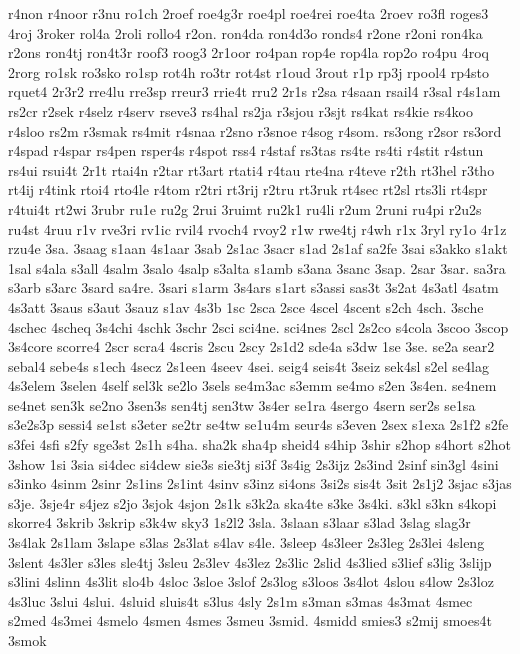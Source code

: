 {r4non
r4noor
r3nu
ro1ch
2roef
roe4g3r
roe4pl
roe4rei
roe4ta
2roev
ro3fl
roges3
4roj
3roker
rol4a
2roli
rollo4
r2on.
ron4da
ron4d3o
ronds4
r2one
r2oni
ron4ka
r2ons
ron4tj
ron4t3r
roof3
roog3
2r1oor
ro4pan
rop4e
rop4la
rop2o
ro4pu
4roq
2rorg
ro1sk
ro3sko
ro1sp
rot4h
ro3tr
rot4st
r1oud
3rout
r1p
rp3j
rpool4
rp4sto
rquet4
2r3r2
rre4lu
rre3sp
rreur3
rrie4t
rru2
2r1s
r2sa
r4saan
rsail4
r3sal
r4s1am
rs2cr
r2sek
r4selz
r4serv
rseve3
rs4hal
rs2ja
r3sjou
r3sjt
rs4kat
rs4kie
rs4koo
r4sloo
rs2m
r3smak
rs4mit
r4snaa
r2sno
r3snoe
r4sog
r4som.
rs3ong
r2sor
rs3ord
r4spad
r4spar
rs4pen
rsper4s
r4spot
rss4
r4staf
rs3tas
rs4te
rs4ti
r4stit
r4stun
rs4ui
rsui4t
2r1t
rtai4n
r2tar
rt3art
rtati4
r4tau
rte4na
r4teve
r2th
rt3hel
r3tho
rt4ij
r4tink
rtoi4
rto4le
r4tom
r2tri
rt3rij
r2tru
rt3ruk
rt4sec
rt2sl
rts3li
rt4spr
r4tui4t
rt2wi
3rubr
ru1e
ru2g
2rui
3ruimt
ru2k1
ru4li
r2um
2runi
ru4pi
r2u2s
ru4st
4ruu
r1v
rve3ri
rv1ic
rvil4
rvoch4
rvoy2
r1w
rwe4tj
r4wh
r1x
3ryl
ry1o
4r1z
rzu4e
3sa.
3saag
s1aan
4s1aar
3sab
2s1ac
3sacr
s1ad
2s1af
sa2fe
3sai
s3akko
s1akt
1sal
s4ala
s3all
4salm
3salo
4salp
s3alta
s1amb
s3ana
3sanc
3sap.
2sar
3sar.
sa3ra
s3arb
s3arc
3sard
sa4re.
3sari
s1arm
3s4ars
s1art
s3assi
sas3t
3s2at
4s3atl
4satm
4s3att
3saus
s3aut
3sauz
s1av
4s3b
1sc
2sca
2sce
4scel
4scent
s2ch
4sch.
3sche
4schec
4scheq
3s4chi
4schk
3schr
2sci
sci4ne.
sci4nes
2scl
2s2co
s4cola
3scoo
3scop
3s4core
scorre4
2scr
scra4
4scris
2scu
2scy
2s1d2
sde4a
s3dw
1se
3se.
se2a
sear2
sebal4
sebe4s
s1ech
4secz
2s1een
4seev
4sei.
seig4
seis4t
3seiz
sek4sl
s2el
se4lag
4s3elem
3selen
4self
sel3k
se2lo
3sels
se4m3ac
s3emm
se4mo
s2en
3s4en.
se4nem
se4net
sen3k
se2no
3sen3s
sen4tj
sen3tw
3s4er
se1ra
4sergo
4sern
ser2s
se1sa
s3e2s3p
sessi4
se1st
s3eter
se2tr
se4tw
se1u4m
seur4s
s3even
2sex
s1exa
2s1f2
s2fe
s3fei
4sfi
s2fy
sge3st
2s1h
s4ha.
sha2k
sha4p
sheid4
s4hip
3shir
s2hop
s4hort
s2hot
3show
1si
3sia
si4dec
si4dew
sie3s
sie3tj
si3f
3s4ig
2s3ijz
2s3ind
2sinf
sin3gl
4sini
s3inko
4sinm
2sinr
2s1ins
2s1int
4sinv
s3inz
si4ons
3si2s
sis4t
3sit
2s1j2
3sjac
s3jas
s3je.
3sje4r
s4jez
s2jo
3sjok
4sjon
2s1k
s3k2a
ska4te
s3ke
3s4ki.
s3kl
s3kn
s4kopi
skorre4
3skrib
3skrip
s3k4w
sky3
1s2l2
3sla.
3slaan
s3laar
s3lad
3slag
slag3r
3s4lak
2s1lam
3slape
s3las
2s3lat
s4lav
s4le.
3sleep
4s3leer
2s3leg
2s3lei
4sleng
3slent
4s3ler
s3les
sle4tj
3sleu
2s3lev
4s3lez
2s3lic
2slid
4s3lied
s3lief
s3lig
3slijp
s3lini
4slinn
4s3lit
slo4b
4sloc
3sloe
3slof
2s3log
s3loos
3s4lot
4slou
s4low
2s3loz
4s3luc
3slui
4slui.
4sluid
sluis4t
s3lus
4sly
2s1m
s3man
s3mas
4s3mat
4smec
s2med
4s3mei
4smelo
4smen
4smes
3smeu
3smid.
4smidd
smies3
s2mij
smoes4t
3smok
}
